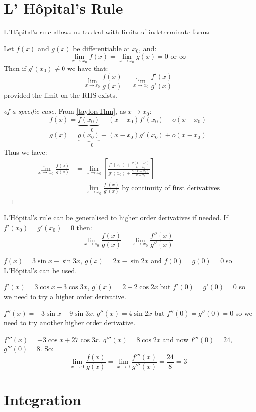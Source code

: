 \documentclass[../main.tex]{subfiles}
\begin{document}
\section{L' H\^opital's Rule}
L'H\^opital's rule allows us to deal with limits of indeterminate forms.
\begin{theorem}
  Let $f(x)$ and $g(x)$ be differentiable at $x_0$, and:
  \[
    \lim_{x \to x_0} f(x) = \lim_{x \to x_0} g(x) = 0 \text{ or } \infty
  \]
  Then if $g'(x_0) \neq 0$ we have that:
  \[
    \lim_{x \to x_0} \frac{f(x)}{g(x)} = \lim_{x \to x_0} \frac{f'(x)}{g'(x)}
  \]
  provided the limit on the RHS exists.
\end{theorem}
\begin{proof}[of a specific case]
  From \cref{taylorsThm}, as $x \to x_0$:
  \[
    f(x) = \underbrace{f(x_0)}_{=0} + (x - x_0)f'(x_0) + o(x - x_0)
  \]
  \[
    g(x) = \underbrace{g(x_0)}_{=0} + (x - x_0)g'(x_0) + o(x - x_0)
  \]
  Thus we have:
  \begin{align*}
    \lim_{x \to x_0} \frac{f(x)}{g(x)} &= \lim_{x \to x_0} \left[\frac{f'(x_0) + \frac{o(x-x_0)}{x-x_0}}{g'(x_0) + \frac{o(x-x_0)}{x-x_0}}\right] \\
                                       &= \lim_{x \to x_0} \frac{f'(x)}{g'(x)} \text{ by continuity of first derivatives}
  \end{align*}
\end{proof}
L'H\^opital's rule can be generalised to higher order derivatives if needed.
If $f'(x_0) = g'(x_0) = 0$ then:
\[
  \lim_{x \to x_0} \frac{f(x)}{g(x)} = \lim_{x \to x_0} \frac{f''(x)}{g''(x)}
\]
\begin{example}
  $f(x) = 3\sin x - \sin 3x$, $g(x) = 2x - \sin 2x$ and $f(0) = g(0) = 0$ so L'H\^opital's can be used.

  $f'(x) = 3\cos x - 3\cos3x$, $g'(x) = 2 - 2\cos2x$ but $f'(0) = g'(0) = 0$ so we need to try a higher order derivative.

  $f''(x) = -3\sin x + 9\sin3x$, $g''(x) = 4\sin2x$ but $f''(0) = g''(0) = 0$ so we need to try another higher order derivative.

  $f'''(x) = -3\cos x + 27\cos3x$, $g'''(x) = 8\cos2x$ and now $f'''(0) = 24$, $g'''(0) = 8$.
  So:
  \[
    \lim_{x \to 0} \frac{f(x)}{g(x)} = \lim_{x \to 0} \frac{f'''(x)}{g'''(x)} = \frac{24}{8} = 3
  \]
\end{example}
\section{Integration}
\end{document}
